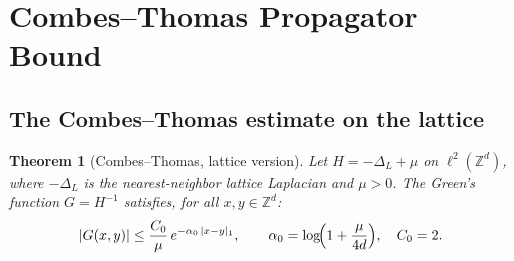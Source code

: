 \documentclass[11pt,a4paper]{amsart}
\newtheorem{theorem}{Theorem}[section]
\theoremstyle{definition}
\newcommand{\Z}{\mathbb{Z}}
\begin{document}
\section{Combes--Thomas Propagator Bound}
\label{sec:CT}

\subsection{The Combes--Thomas estimate on the lattice}

\begin{theorem}[Combes--Thomas, lattice version]
\label{thm:CT}
Let $H = -\Delta_L + \mu$ on $\ell^2(\Z^d)$,
where $-\Delta_L$ is the nearest-neighbor lattice Laplacian and $\mu > 0$.
The Green's function $G = H^{-1}$ satisfies, for all $x, y\in\Z^d$:
\begin{equation}
\label{eq:CT_bound}
  |G(x,y)| \le \frac{C_0}{\mu}\,e^{-\alpha_0\,|x-y|_1},
  \qquad
  \alpha_0 = \log\!\Bigl(1+\frac{\mu}{4d}\Bigr),
  \quad
  C_0 = 2.
\end{equation}
\end{theorem}
\end{document}
